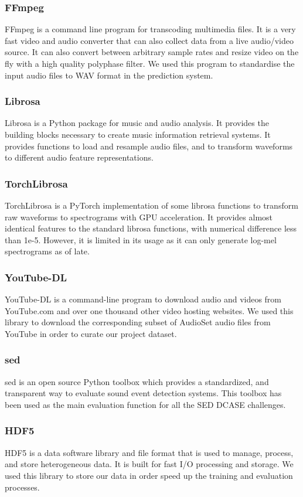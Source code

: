 \subsubsection{FFmpeg}
FFmpeg \cite{tomar2006converting} is a command line program for transcoding multimedia files. It is a very fast video and audio converter that can also collect data from a live audio/video source. It can also convert between arbitrary sample rates and resize video on the fly with a high quality polyphase filter. We used this program to standardise the input audio files to WAV format in the prediction system.

\subsubsection{Librosa}
Librosa \cite{brian_mcfee_2021_4792298} is a Python package for music and audio analysis. It provides the building blocks necessary to create music information retrieval systems. It provides functions to load and resample audio files, and to transform waveforms to different audio feature representations.

\subsubsection{TorchLibrosa}
TorchLibrosa \cite{torchlibrosa} is a PyTorch implementation of some librosa functions to transform raw waveforms to spectrograms with GPU acceleration. It provides almost identical features to the standard librosa functions, with numerical difference less than 1e-5. However, it is limited in its usage as it can only generate log-mel spectrograms as of late.

\subsubsection{YouTube-DL}
YouTube-DL is a command-line program to download audio and videos from YouTube.com and over one thousand other video hosting websites. We used this library to download the corresponding subset of AudioSet audio files from YouTube in order to curate our project dataset.

\subsubsection{sed}
sed \cite{sed-eval} is an open source Python toolbox which provides a standardized, and transparent way to evaluate sound event detection systems. This toolbox has been used as the main evaluation function for all the SED DCASE challenges.

\subsubsection{HDF5}
HDF5 \cite{hdf5} is a data software library and file format that is used to manage, process, and store heterogeneous data. It is built for fast I/O processing and storage. We used this library to store our data in order speed up the training and evaluation processes.

\newpage